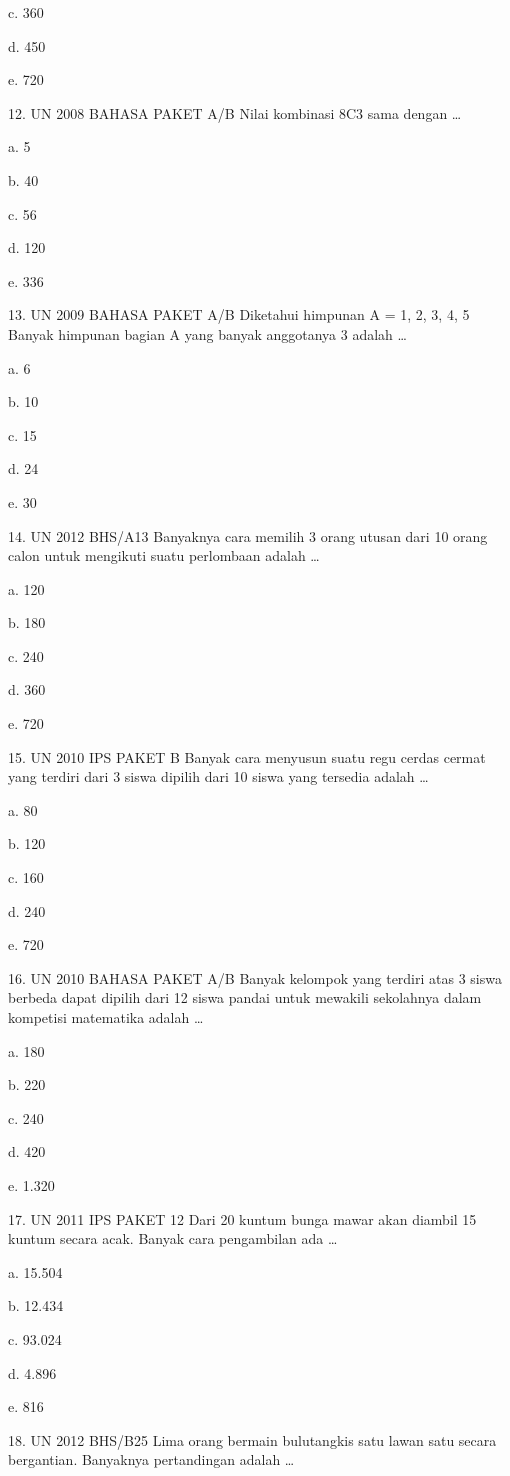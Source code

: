\documentclass[11pt,fleqn]{book} %
\begin{document}
c.	360

d.	450

e.	720

12.	UN 2008 BAHASA PAKET A/B 
Nilai kombinasi 8C3 sama dengan …

a.	5

b.	40

c.	56

d.	120

e.	336

13.	UN 2009 BAHASA PAKET A/B 
Diketahui himpunan A = {1, 2, 3, 4, 5} Banyak himpunan bagian A yang banyak anggotanya 3 adalah …

a.	6

b.	10

c.	15

d.	24

e.	30

14.	UN 2012 BHS/A13 
Banyaknya cara memilih 3 orang utusan dari 10 orang calon untuk mengikuti suatu perlombaan adalah …

a.	120

b.	180

c.	240

d.	360

e.	720

15.	UN 2010 IPS PAKET B 
Banyak cara menyusun suatu regu cerdas cermat yang terdiri dari 3 siswa dipilih dari 10 siswa yang tersedia adalah …

a.	80

b.	120

c.	160

d.	240

e.	720

16.	UN 2010 BAHASA PAKET A/B 
Banyak kelompok yang terdiri atas 3 siswa berbeda dapat dipilih dari 12 siswa pandai untuk mewakili sekolahnya dalam kompetisi matematika adalah …

a.	180

b.	220

c.	240

d.	420

e.	1.320

17.	UN 2011 IPS PAKET 12 
Dari 20 kuntum bunga mawar akan diambil 15 kuntum secara acak. Banyak cara pengambilan ada …

a.	15.504

b.	12.434

c.	93.024

d.	4.896

e.	816

18.	UN 2012 BHS/B25 
Lima orang bermain bulutangkis satu lawan satu secara bergantian. Banyaknya pertandingan adalah …
\end{document}
